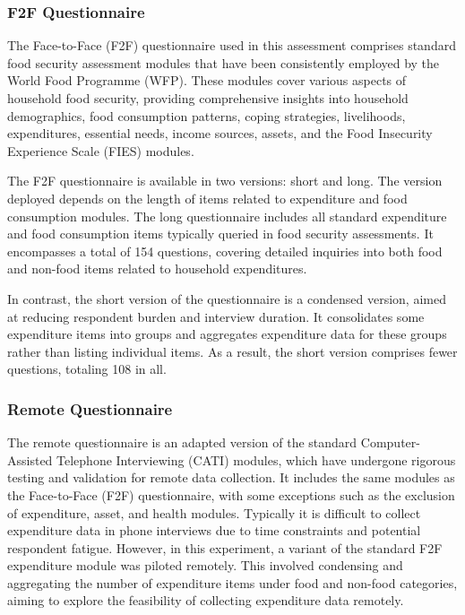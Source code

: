 \documentclass[11pt,harvard]{article}
\begin{document}
\subsubsection{F2F Questionnaire}
	
The Face-to-Face (F2F) questionnaire used in this assessment comprises standard food security assessment modules that have been consistently employed by the World Food Programme (WFP). These modules cover various aspects of household food security, providing comprehensive insights into household demographics, food consumption patterns, coping strategies, livelihoods, expenditures, essential needs, income sources, assets, and the Food Insecurity Experience Scale (FIES) modules.

The F2F questionnaire is available in two versions: short and long. The version deployed depends on the length of items related to expenditure and food consumption modules. The long questionnaire includes all standard expenditure and food consumption items typically queried in food security assessments. It encompasses a total of 154 questions, covering detailed inquiries into both food and non-food items related to household expenditures.

In contrast, the short version of the questionnaire is a condensed version, aimed at reducing respondent burden and interview duration. It consolidates some expenditure items into groups and aggregates expenditure data for these groups rather than listing individual items. As a result, the short version comprises fewer questions, totaling 108 in all.

		
\subsubsection{Remote Questionnaire}

The remote questionnaire is an adapted version of the standard Computer-Assisted Telephone Interviewing (CATI) modules, which have undergone rigorous testing and validation for remote data collection. It includes the same modules as the Face-to-Face (F2F) questionnaire, with some exceptions such as the exclusion of expenditure, asset, and health modules. Typically it is difficult to collect expenditure data in phone interviews due to time constraints and potential respondent fatigue. However, in this experiment, a variant of the standard F2F expenditure module was piloted remotely. This involved condensing and aggregating the number of expenditure items under food and non-food categories, aiming to explore the feasibility of collecting expenditure data remotely.
\end{document}
